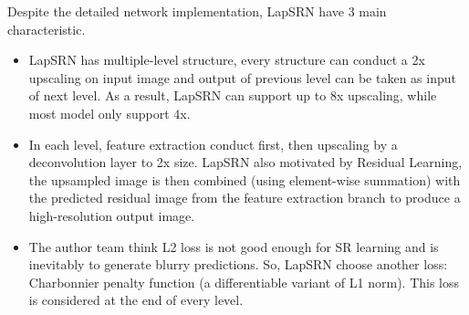 \documentclass[10pt,twocolumn,letterpaper]{article}
\begin{document}
Despite the detailed network implementation, LapSRN have 3 main characteristic.
\begin{itemize}
    \item LapSRN has multiple-level structure, every structure can conduct a 2x upscaling on input image and output of previous level can be taken as input of next level. 
    As a result, LapSRN can support up to 8x upscaling, while most model only support 4x. 
    \item In each level, feature extraction conduct first, then upscaling by a deconvolution layer to 2x size. 
    LapSRN also motivated by Residual Learning\cite{7}, the upsampled image is then combined (using element-wise summation) with the predicted residual image from the feature extraction branch to produce a high-resolution output image.
    \item The author team think L2 loss is not good enough for SR learning and is inevitably to generate blurry predictions. 
    So, LapSRN choose another loss: Charbonnier penalty function (a differentiable variant of L1 norm)\cite{3}. 
    This loss is considered at the end of every level.
\end{itemize}
\end{document}

